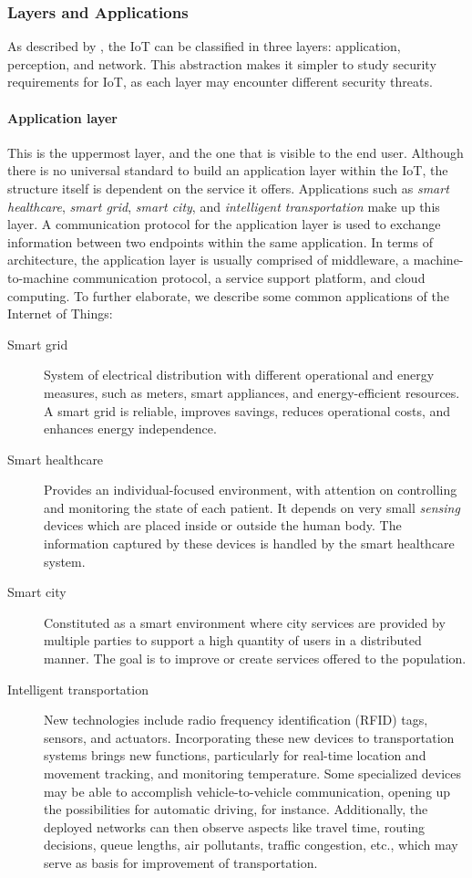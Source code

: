 \documentclass[12pt]{article}
\begin{document}
\subsubsection{Layers and Applications}
As described by \citet{ALABA201710}, the IoT can be classified in three layers: application, perception, and network. This abstraction makes it simpler to study security requirements for IoT, as each layer may encounter different security threats. 

\paragraph{Application layer} This is the uppermost layer, and the one that is visible to the end user. Although there is no universal standard to build an application layer within the IoT, the structure itself is dependent on the service it offers. Applications such as \emph{smart healthcare}, \emph{smart grid}, \emph{smart city}, and \emph{intelligent transportation} make up this layer. A communication protocol for the application layer is used to exchange information between two endpoints within the same application. In terms of architecture, the application layer is usually comprised of middleware, a machine-to-machine communication protocol, a service support platform, and cloud computing. To further elaborate, we describe some common applications of the Internet of Things:

\begin{description}
\item [Smart grid] System of electrical distribution with different operational and energy measures, such as meters, smart appliances, and energy-efficient resources. A smart grid is reliable, improves savings, reduces operational costs, and enhances energy independence. 
\item [Smart healthcare] Provides an individual-focused environment, with attention on controlling and monitoring the state of each patient. It depends on very small \emph{sensing} devices which are placed inside or outside the human body. The information captured by these devices is handled by the smart healthcare system.
\item [Smart city] Constituted as a smart environment where city services are provided by multiple parties to support a high quantity of users in a distributed manner. The goal is to improve or create services offered to the population.
\item [Intelligent transportation] New technologies include radio frequency identification (RFID) tags, sensors, and actuators. Incorporating these new devices to transportation systems brings new functions, particularly for real-time location and movement tracking, and monitoring temperature. Some specialized devices may be able to accomplish vehicle-to-vehicle communication, opening up the possibilities for automatic driving, for instance. Additionally, the deployed networks can then observe aspects like travel time, routing decisions, queue lengths, air pollutants, traffic congestion, etc., which may serve as basis for improvement of transportation.
\end{description}
\end{document}
